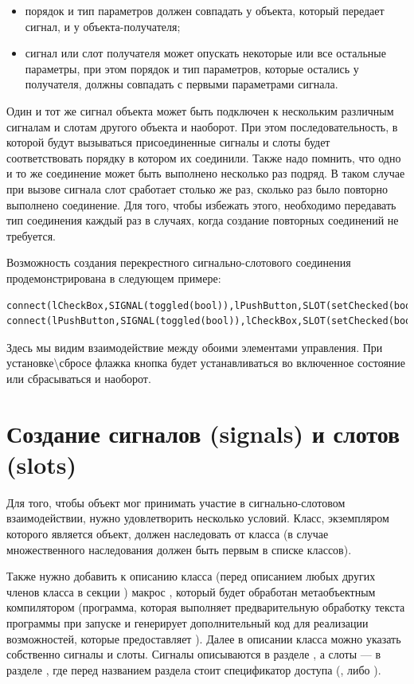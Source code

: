 \begin{itemize}
\item порядок и тип параметров должен совпадать у объекта, который передает сигнал, и у объекта-получателя;
\item сигнал или слот получателя может опускать некоторые или все остальные параметры, при этом порядок и тип
параметров, которые остались у получателя, должны совпадать с первыми параметрами сигнала.
\end{itemize}
Один и тот же сигнал объекта может быть подключен к нескольким различным сигналам и слотам другого объекта и наоборот.
При этом последовательность, в которой будут вызываться присоединенные сигналы и слоты будет соответствовать порядку в
котором их соединили. Также надо помнить, что одно и то же соединение может быть выполнено несколько раз подряд. В
таком случае при вызове сигнала слот сработает столько же раз, сколько раз было повторно выполнено соединение. Для того,
чтобы избежать этого, необходимо передавать тип соединения  каждый раз в случаях, когда
создание повторных соединений не требуется.

Возможность создания перекрестного сигнально-слотового соединения продемонстрирована в следующем примере:
\begin{lstlisting}
connect(lCheckBox,SIGNAL(toggled(bool)),lPushButton,SLOT(setChecked(bool)));
connect(lPushButton,SIGNAL(toggled(bool)),lCheckBox,SLOT(setChecked(bool)));
\end{lstlisting}

Здесь мы видим взаимодействие между обоими элементами управления. При установке{\textbackslash}сбросе флажка кнопка
будет устанавливаться во включенное состояние или сбрасываться и наоборот.

\section[Создание сигналов (signals) и слотов (slots)]{Создание сигналов (signals) и слотов (slots)}
Для того, чтобы объект мог принимать участие в сигнально-слотовом взаимодействии, нужно удовлетворить несколько условий.
Класс, экземпляром которого является объект, должен наследовать от класса  (в случае множественного
наследования  должен быть первым в списке классов). 

Также нужно добавить к описанию класса (перед описанием любых других членов класса в секции ) макрос
, который будет обработан метаобъектным компилятором  (программа, которая выполняет
предварительную обработку текста программы при запуске  и генерирует дополнительный код для реализации
возможностей, которые предоставляет ). Далее в описании класса можно указать собственно сигналы и слоты.
Сигналы описываются в разделе , а слоты ---  в разделе , где перед названием
раздела стоит спецификатор доступа (,  либо ). 

